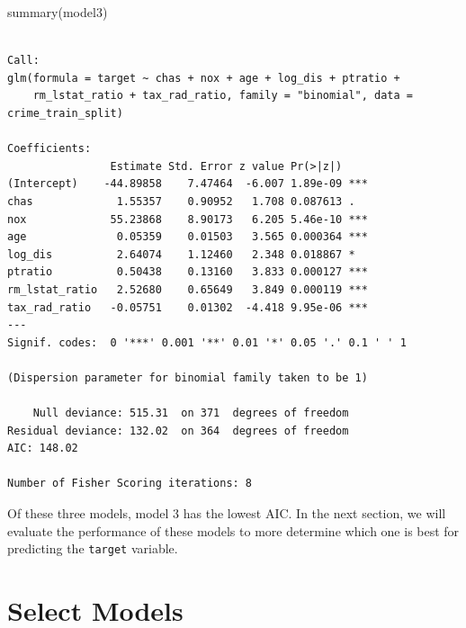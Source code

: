 \documentclass[
  11pt]{article}
\newenvironment{Shaded}{\begin{snugshade}}{\end{snugshade}}
\newcommand{\FunctionTok}[1]{\textcolor[rgb]{0.28,0.35,0.67}{#1}}
\newcommand{\NormalTok}[1]{\textcolor[rgb]{0.00,0.23,0.31}{#1}}
\begin{document}
\begin{Shaded}
\begin{Highlighting}[]
\FunctionTok{summary}\NormalTok{(model3)}
\end{Highlighting}
\end{Shaded}

\begin{verbatim}

Call:
glm(formula = target ~ chas + nox + age + log_dis + ptratio + 
    rm_lstat_ratio + tax_rad_ratio, family = "binomial", data = crime_train_split)

Coefficients:
                Estimate Std. Error z value Pr(>|z|)    
(Intercept)    -44.89858    7.47464  -6.007 1.89e-09 ***
chas             1.55357    0.90952   1.708 0.087613 .  
nox             55.23868    8.90173   6.205 5.46e-10 ***
age              0.05359    0.01503   3.565 0.000364 ***
log_dis          2.64074    1.12460   2.348 0.018867 *  
ptratio          0.50438    0.13160   3.833 0.000127 ***
rm_lstat_ratio   2.52680    0.65649   3.849 0.000119 ***
tax_rad_ratio   -0.05751    0.01302  -4.418 9.95e-06 ***
---
Signif. codes:  0 '***' 0.001 '**' 0.01 '*' 0.05 '.' 0.1 ' ' 1

(Dispersion parameter for binomial family taken to be 1)

    Null deviance: 515.31  on 371  degrees of freedom
Residual deviance: 132.02  on 364  degrees of freedom
AIC: 148.02

Number of Fisher Scoring iterations: 8
\end{verbatim}

Of these three models, model 3 has the lowest AIC. In the next section,
we will evaluate the performance of these models to more determine which
one is best for predicting the \texttt{target} variable.

\section{Select Models}\label{select-models}
\end{document}
